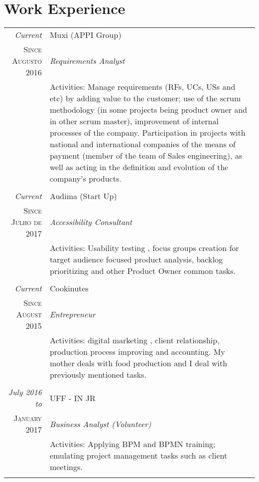 \documentclass[a4paper,10pt]{article}
\begin{document}
\section{Work Experience}
\begin{tabular}{r|p{11cm}}
 \emph{Current} & Muxi (APPI Group) \\
 \textsc{Since Augusto 2016}&\emph{Requirements Analyst}\\
 &\footnotesize{Activities: Manage requirements (RFs, UCs, USs and etc) by adding value to the customer; use of the scrum methodology (in some projects being product owner and in other scrum master), improvement of internal processes of the company. Participation in projects with national and international companies of the means of payment (member of the team of Sales engineering), as well as acting in the definition and evolution of the company's products.}\\
  
 & \\
 
 \emph{Current} & Audima (Start Up) \\
 \textsc{Since Julho de 2017}&\emph{Accessibility Consultant}\\
 &\footnotesize{Activities: Usability testing , focus groups creation for target audience focused product analysis, backlog prioritizing and other Product Owner common tasks.}\\
 
 & \\
 
 \emph{Current} & Cookinutes \\
 \textsc{Since August 2015}&\emph{Entrepreneur}\\
 &\footnotesize{Activities: digital marketing , client relationship, production process improving and accounting. My mother deals with food production and I deal with previously mentioned tasks.}\\
 
 & \\
 
 \emph{July 2016 to} & UFF - IN JR \\
 \textsc{January 2017}&\emph{Business Analyst (Volunteer)}\\
 &\footnotesize{Activities: Applying BPM and BPMN training; emulating project management tasks such as client meetings.}\\
 
 & \\
 

\end{tabular}
\end{document}
